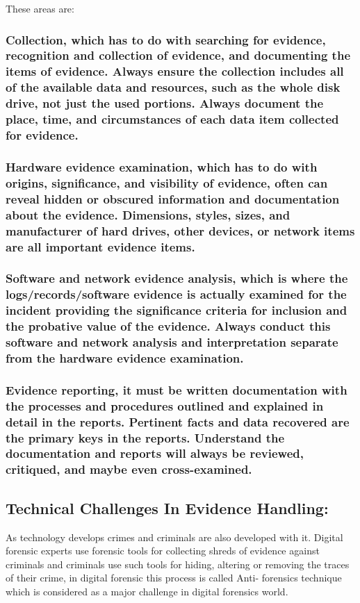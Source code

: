 \documentclass[british]{article}
\begin{document}
These areas are:

\subsubsection{Collection, which has to do with searching for evidence, recognition
and collection of evidence, and documenting the items of evidence.
Always ensure the collection includes all of the available data and
resources, such as the whole disk drive, not just the used portions.
Always document the place, time, and circumstances of each data item
collected for evidence.}

\subsubsection{Hardware evidence examination, which has to do with origins, significance,
and visibility of evidence, often can reveal hidden or obscured information
and documentation about the evidence. Dimensions, styles, sizes, and
manufacturer of hard drives, other devices, or network items are all
important evidence items.}

\subsubsection{Software and network evidence analysis, which is where the logs/records/software
evidence is actually examined for the incident providing the significance
criteria for inclusion and the probative value of the evidence. Always
conduct this software and network analysis and interpretation separate
from the hardware evidence examination.}

\subsubsection{Evidence reporting, it must be written documentation with the processes
and procedures outlined and explained in detail in the reports. Pertinent
facts and data recovered are the primary keys in the reports. Understand
the documentation and reports will always be reviewed, critiqued,
and maybe even cross-examined.}

\pagebreak{}

\subsection{Technical Challenges In Evidence Handling:}

As technology develops crimes and criminals are also developed with
it. Digital forensic experts use forensic tools for collecting shreds
of evidence against criminals and criminals use such tools for hiding,
altering or removing the traces of their crime, in digital forensic
this process is called Anti- forensics technique which is considered
as a major challenge in digital forensics world.
\end{document}
